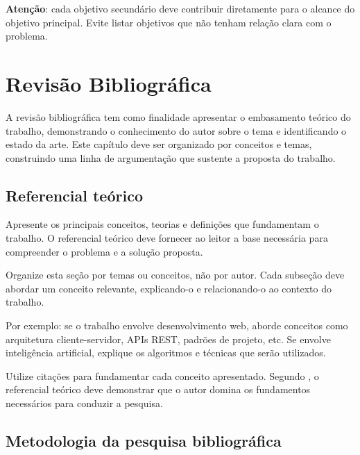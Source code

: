 \documentclass[
    12pt,                %
    openright,           %
    oneside,             %
    a4paper,             %
    english,             %
    brazil               %
]{abntex2}
\begin{document}
\textbf{Atenção}: cada objetivo secundário deve contribuir diretamente para o alcance do objetivo principal. Evite listar objetivos que não tenham relação clara com o problema.

\chapter{Revisão Bibliográfica}
\label{cap:revisao}

A revisão bibliográfica tem como finalidade apresentar o embasamento teórico do trabalho, demonstrando o conhecimento do autor sobre o tema e identificando o estado da arte. Este capítulo deve ser organizado por conceitos e temas, construindo uma linha de argumentação que sustente a proposta do trabalho.

\section{Referencial teórico}
\label{sec:referencial}

Apresente os principais conceitos, teorias e definições que fundamentam o trabalho. O referencial teórico deve fornecer ao leitor a base necessária para compreender o problema e a solução proposta.

Organize esta seção por temas ou conceitos, não por autor. Cada subseção deve abordar um conceito relevante, explicando-o e relacionando-o ao contexto do trabalho.

Por exemplo: se o trabalho envolve desenvolvimento web, aborde conceitos como arquitetura cliente-servidor, APIs REST, padrões de projeto, etc. Se envolve inteligência artificial, explique os algoritmos e técnicas que serão utilizados.

Utilize citações para fundamentar cada conceito apresentado. Segundo , o referencial teórico deve demonstrar que o autor domina os fundamentos necessários para conduzir a pesquisa.

\section{Metodologia da pesquisa bibliográfica}
\label{sec:metodologia_pesquisa}
\end{document}
